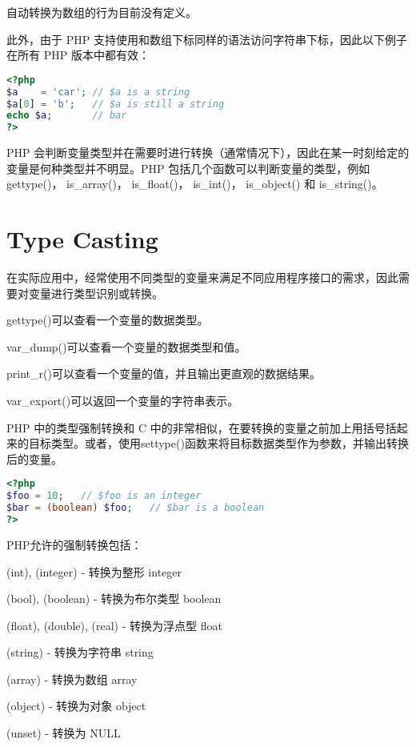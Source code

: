 自动转换为数组的行为目前没有定义。

此外，由于 PHP 支持使用和数组下标同样的语法访问字符串下标，因此以下例子在所有 PHP 版本中都有效：

\begin{lstlisting}[language=PHP]
<?php
$a    = 'car'; // $a is a string
$a[0] = 'b';   // $a is still a string
echo $a;       // bar
?>
\end{lstlisting}

PHP 会判断变量类型并在需要时进行转换（通常情况下），因此在某一时刻给定的变量是何种类型并不明显。PHP 包括几个函数可以判断变量的类型，例如gettype()， is\_array()， is\_float()， is\_int()， is\_object() 和 is\_string()。

\section{Type Casting}

在实际应用中，经常使用不同类型的变量来满足不同应用程序接口的需求，因此需要对变量进行类型识别或转换。

\begin{compactitem}
\item gettype()可以查看一个变量的数据类型。
\item var\_dump()可以查看一个变量的数据类型和值。
\item print\_r()可以查看一个变量的值，并且输出更直观的数据结果。
\item var\_export()可以返回一个变量的字符串表示。
\end{compactitem}

PHP 中的类型强制转换和 C 中的非常相似，在要转换的变量之前加上用括号括起来的目标类型。或者，使用settype()函数来将目标数据类型作为参数，并输出转换后的变量。


\begin{lstlisting}[language=PHP]
<?php
$foo = 10;   // $foo is an integer
$bar = (boolean) $foo;   // $bar is a boolean
?>
\end{lstlisting}


PHP允许的强制转换包括：

\begin{compactitem}
\item (int), (integer) - 转换为整形 integer
\item (bool), (boolean) - 转换为布尔类型 boolean
\item (float), (double), (real) - 转换为浮点型 float
\item (string) - 转换为字符串 string
\item (array) - 转换为数组 array
\item (object) - 转换为对象 object
\item (unset) - 转换为 NULL
\end{compactitem}





